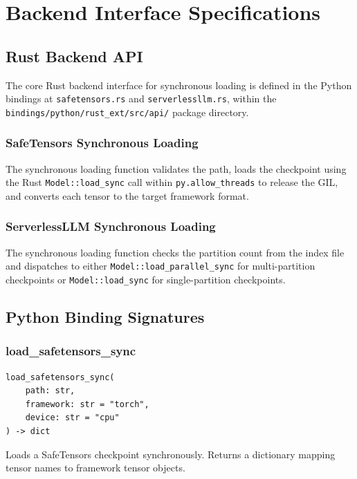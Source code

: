 \appendix
\chapter{Backend Interface Specifications}
\label{app:backend_api}

\section{Rust Backend API}

The core Rust backend interface for synchronous loading is defined in the Python bindings at \texttt{safetensors.rs} and \texttt{serverlessllm.rs}, within the \texttt{bindings/python/rust\_ext/src/api/} package directory.

\subsection{SafeTensors Synchronous Loading}

The synchronous loading function validates the path, loads the checkpoint using the Rust \texttt{Model::load\_sync} call within \texttt{py.allow\_threads} to release the GIL, and converts each tensor to the target framework format.

\subsection{ServerlessLLM Synchronous Loading}

The synchronous loading function checks the partition count from the index file and dispatches to either \texttt{Model::load\_parallel\_sync} for multi-partition checkpoints or \texttt{Model::load\_sync} for single-partition checkpoints.

\section{Python Binding Signatures}

\subsection{load\_safetensors\_sync}

\small
\begin{verbatim}
load_safetensors_sync(
    path: str,
    framework: str = "torch",
    device: str = "cpu"
) -> dict
\end{verbatim}
\normalsize

Loads a SafeTensors checkpoint synchronously. Returns a dictionary mapping tensor names to framework tensor objects.

